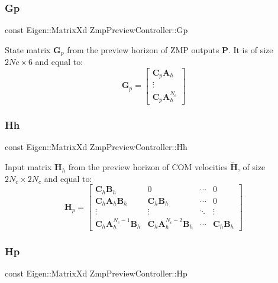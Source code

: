 \subsubsection{\texorpdfstring{Gp}{Gp}}
{\footnotesize\ttfamily const Eigen\+::\+Matrix\+Xd Zmp\+Preview\+Controller\+::\+Gp\hspace{0.3cm}{\ttfamily [private]}}

State matrix $\mathbf{G}_p$ from the preview horizon of Z\+MP outputs $\mathbf{P}$. It is of size $2Nc \times 6$ and equal to\+: \[ \mathbf{G}_p = \left[\begin{array}{c} \mathbf{C}_p\mathbf{A}_h \\ \vdots \\ \mathbf{C}_p\mathbf{A}^{N_c}_h \end{array}\right] \] \hypertarget{classZmpPreviewController_a8caaf8bf8f06e5b0b53d2cd5c131eefd}{}\label{classZmpPreviewController_a8caaf8bf8f06e5b0b53d2cd5c131eefd} 
\subsubsection{\texorpdfstring{Hh}{Hh}}
{\footnotesize\ttfamily const Eigen\+::\+Matrix\+Xd Zmp\+Preview\+Controller\+::\+Hh\hspace{0.3cm}{\ttfamily [private]}}

Input matrix $\mathbf{H}_h$ from the preview horizon of C\+OM velocities $\tilde{\mathbf{H}}$, of size $2N_c \times 2N_c$ and equal to\+: \[ \mathbf{H}_p = \left[\begin{array}{cccc} \mathbf{C}_h\mathbf{B}_h & 0 & \cdots & 0 \\ \mathbf{C}_h\mathbf{A}_h\mathbf{B}_h & \mathbf{C}_h\mathbf{B}_h & \cdots & 0 \\ \vdots & \vdots & \ddots & \vdots \\ \mathbf{C}_h\mathbf{A}^{N_c-1}_h\mathbf{B}_h & \mathbf{C}_h\mathbf{A}^{N_c-2}_h\mathbf{B}_h & \cdots & \mathbf{C}_h\mathbf{B}_h \end{array}\right] \] \hypertarget{classZmpPreviewController_a32ab17a3be30490e4a1e874bf3581843}{}\label{classZmpPreviewController_a32ab17a3be30490e4a1e874bf3581843} 
\subsubsection{\texorpdfstring{Hp}{Hp}}
{\footnotesize\ttfamily const Eigen\+::\+Matrix\+Xd Zmp\+Preview\+Controller\+::\+Hp\hspace{0.3cm}{\ttfamily [private]}}

